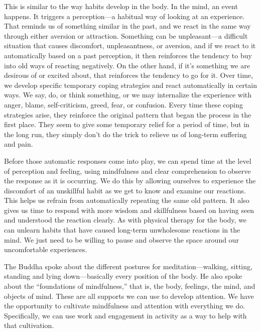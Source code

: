 This is similar to the way habits develop in the body. In the mind, an 
event happens. It triggers a perception---a habitual way of looking at 
an experience. That reminds us of something similar in the past, and we 
react in the same way through either aversion or attraction. Something 
can be unpleasant---a difficult situation that causes discomfort, 
unpleasantness, or aversion, and if we react to it automatically based 
on a past perception, it then reinforces the tendency to buy into old 
ways of reacting negatively. On the other hand, if it's something we 
are desirous of or excited about, that reinforces the tendency to go 
for it. Over time, we develop specific temporary coping strategies and 
react automatically in certain ways. We say, do, or think something, or 
we may internalize the experience with anger, blame, self-criticism, 
greed, fear, or confusion. Every time these coping strategies arise, 
they reinforce the original pattern that began the process in the first 
place. They seem to give some temporary relief for a period of time, 
but in the long run, they simply don't do the trick to relieve us of 
long-term suffering and pain.

Before those automatic responses come into play, we can spend time at 
the level of perception and feeling, using mindfulness and clear 
comprehension to observe the response as it is occurring. We do this by 
allowing ourselves to experience the discomfort of an unskillful habit 
as we get to know and examine our reactions. This helps us refrain from 
automatically repeating the same old pattern. It also gives us time to 
respond with more wisdom and skillfulness based on having seen and 
understood the reaction clearly. As with physical therapy for the body, 
we can unlearn habits that have caused long-term unwholesome reactions 
in the mind. We just need to be willing to pause and observe the space 
around our uncomfortable experiences.


The Buddha spoke about the different postures for meditation---walking, 
sitting, standing and lying down---basically every position of the 
body. He also spoke about the ``foundations of mindfulness,'' that is, 
the body, feelings, the mind, and objects of mind. These are all 
supports we can use to develop attention. We have the opportunity to 
cultivate mindfulness and attention with everything we do. 
Specifically, we can use work and engagement in activity as a way to 
help with that cultivation.

